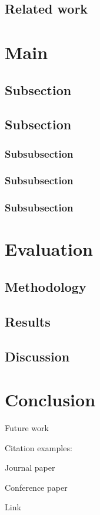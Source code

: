 \documentclass[conference]{IEEEtran}
\begin{document}
\subsection{Related work}


\section{Main}

\subsection{Subsection}



\subsection{Subsection}


\subsubsection{Subsubsection}


\subsubsection{Subsubsection}


\subsubsection{Subsubsection}



\section{Evaluation}
\subsection{Methodology}


\subsection{Results}

\subsection{Discussion}



\section{Conclusion}
Future work

Citation examples:

Journal paper \cite{Koeplinger2018}

Conference paper \cite{Siefke2022}

Link \cite{Gapuino}




\end{document}
